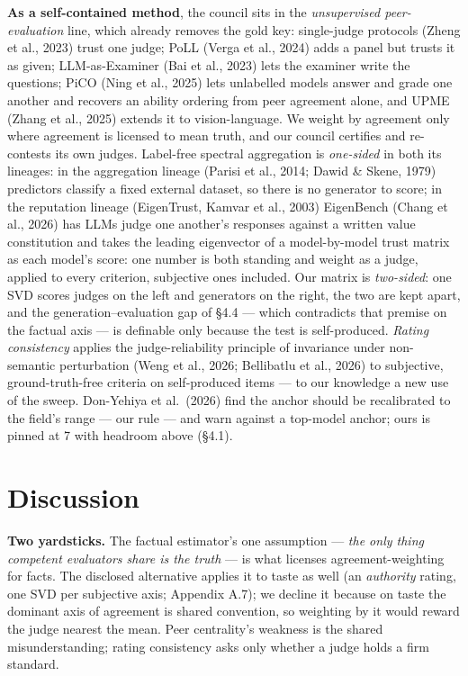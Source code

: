 \documentclass{article}
\begin{document}
\textbf{As a self-contained method}, the council sits in the \emph{unsupervised peer-evaluation} line, which already removes the gold key: single-judge protocols (Zheng et al., 2023) trust one judge; PoLL (Verga et al., 2024) adds a panel but trusts it as given; LLM-as-Examiner (Bai et al., 2023) lets the examiner write the questions; PiCO (Ning et al., 2025) lets unlabelled models answer and grade one another and recovers an ability ordering from peer agreement alone, and UPME (Zhang et al., 2025) extends it to vision-language. We weight by agreement only where agreement is licensed to mean truth, and our council certifies and re-contests its own judges. Label-free spectral aggregation is \emph{one-sided} in both its lineages: in the aggregation lineage (Parisi et al., 2014; Dawid \& Skene, 1979) predictors classify a fixed external dataset, so there is no generator to score; in the reputation lineage (EigenTrust, Kamvar et al., 2003) EigenBench (Chang et al., 2026) has LLMs judge one another's responses against a written value constitution and takes the leading eigenvector of a model-by-model trust matrix as each model's score: one number is both standing and weight as a judge, applied to every criterion, subjective ones included. Our matrix is \emph{two-sided}: one SVD scores judges on the left and generators on the right, the two are kept apart, and the generation--evaluation gap of \S{}4.4 --- which contradicts that premise on the factual axis --- is definable only because the test is self-produced. \emph{Rating consistency} applies the judge-reliability principle of invariance under non-semantic perturbation (Weng et al., 2026; Bellibatlu et al., 2026) to subjective, ground-truth-free criteria on self-produced items --- to our knowledge a new use of the sweep. Don-Yehiya et al.~(2026) find the anchor should be recalibrated to the field's range --- our rule --- and warn against a top-model anchor; ours is pinned at 7 with headroom above (\S{}4.1).

\section{Discussion}\label{discussion}

\textbf{Two yardsticks.} The factual estimator's one assumption --- \emph{the only thing competent evaluators share is the truth} --- is what licenses agreement-weighting for facts. The disclosed alternative applies it to taste as well (an \emph{authority} rating, one SVD per subjective axis; Appendix A.7); we decline it because on taste the dominant axis of agreement is shared convention, so weighting by it would reward the judge nearest the mean. Peer centrality's weakness is the shared misunderstanding; rating consistency asks only whether a judge holds a firm standard.
\end{document}
